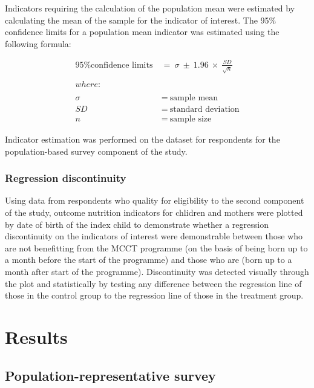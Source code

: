 \documentclass[12pt,a4paper]{article}
\begin{document}
Indicators requiring the calculation of the population mean were estimated by calculating the mean of the sample for the indicator of interest. The 95\% confidence limits for a population mean indicator was estimated using the following formula:

\[
\begin{aligned}
\text{95\% confidence limits} & ~ = ~ \sigma ~ \pm ~ 1.96 ~ \times ~ \frac{SD}{\sqrt{n}} \\
\\
where: & \\
\\
\sigma & ~ = ~ \text{sample mean} \\
SD & ~ = ~ \text{standard deviation} \\
n & ~ = ~ \text{sample size}
\end{aligned}
\]

Indicator estimation was performed on the dataset for respondents for the population-based survey component of the study.

\hypertarget{regression-discontinuity}{%
\subsubsection{Regression discontinuity}\label{regression-discontinuity}}

Using data from respondents who quality for eligibility to the second component of the study, outcome nutrition indicators for chlidren and mothers were plotted by date of birth of the index child to demonstrate whether a regression discontinuity on the indicators of interest were demonstrable between those who are not benefitting from the MCCT programme (on the basis of being born up to a month before the start of the programme) and those who are (born up to a month after start of the programme). Discontinuity was detected visually through the plot and statistically by testing any difference between the regression line of those in the control group to the regression line of those in the treatment group.

\newpage

\hypertarget{results}{%
\section{Results}\label{results}}

\hypertarget{study1-results}{%
\subsection{Population-representative survey}\label{study1-results}}
\end{document}
